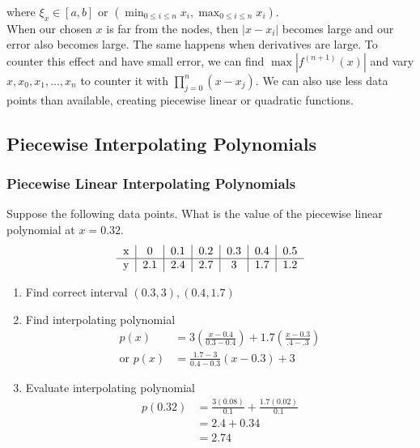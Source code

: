 \documentclass[12pt, letterpaper]{article}
\begin{document}
where $\xi_x \in [a,b]$ or 
$\left(\displaystyle \min_{0\le i\le n}x_i, \max_{0\le i\le n}x_i \right)$. \\

When our chosen $x$ is far from the nodes, then $|x-x_i|$ becomes large and our error also becomes large.
The same happens when derivatives are large. To counter this effect and have small error, we can find $\max |f^{(n+1)}(x)|$
and vary $x,x_0,x_1,...,x_n$ to counter it with $\prod_{j=0}^n(x-x_j)$. We can also use less data points than available, creating piecewise linear or quadratic functions.

\subsection{Piecewise Interpolating Polynomials}
\subsubsection{Piecewise Linear Interpolating Polynomials}
 Suppose the following data points. What is the value of the piecewise linear polynomial at $x=0.32$.
\begin{align*}
    \begin{tabular}{c |c| c| c| c| c| c}
        x & 0 & 0.1 & 0.2 & 0.3 & 0.4 & 0.5 \\ \hline
        y & 2.1 & 2.4 & 2.7 & 3 & 1.7 & 1.2
    \end{tabular}
\end{align*}

\begin{enumerate}
    \item Find correct interval $(0.3,3),(0.4,1.7)$
    \item Find interpolating polynomial 
    \begin{align*}
        p(x) &= 3 \left( \frac{x-0.4}{0.3-0.4}\right) +1.7\left(\frac{x-0.3}{.4-.3} \right) \\
        \text{or } p(x) &= \frac{1.7-3}{0.4-0.3}(x-0.3)+3
    \end{align*}
    \item Evaluate interpolating polynomial
    \begin{align*}
        p(0.32) &= \frac{3(0.08)}{0.1} + \frac{1.7(0.02)}{0.1} \\
                &= 2.4 + 0.34 \\
                &= 2.74
    \end{align*} 
\end{enumerate}
\end{document}
